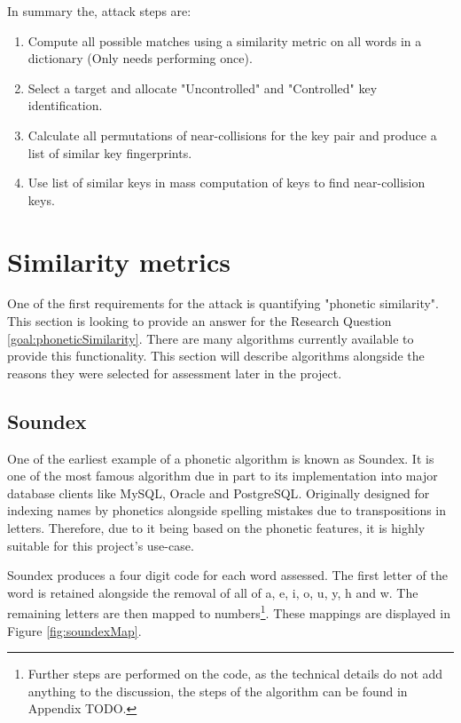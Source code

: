 In summary the, attack steps are:

\begin{enumerate}
    \item Compute all possible matches using a similarity metric on all words in a dictionary (Only needs performing once).

    \item Select a target and allocate "Uncontrolled" and "Controlled" key identification.
    
    \item Calculate all permutations of near-collisions for the key pair and produce a list of similar key fingerprints.
    
    \item Use list of similar keys in mass computation of keys to find near-collision keys.

\end{enumerate}

\section{Similarity metrics}
\label{sec:metrics}
One of the first requirements for the attack is quantifying "phonetic similarity". This section is looking to provide an answer for the Research Question \ref{goal:phoneticSimilarity}. There are many algorithms currently available to provide this functionality. This section will describe algorithms alongside the reasons they were selected for assessment later in the project.

\subsection{Soundex}
One of the earliest example of a phonetic algorithm is known as Soundex. It is one of the most famous algorithm due in part to its implementation into major database clients like MySQL\cite{mysql_soundex}, Oracle\cite{moved_2005} and PostgreSQL\cite{postgresql}. Originally designed for indexing names by phonetics alongside spelling mistakes due to transpositions in letters. Therefore, due to it being based on the phonetic features, it is highly suitable for this project's use-case. 

Soundex produces a four digit code for each word assessed.
The first letter of the word is retained alongside the removal of all of a, e, i, o, u, y, h and w. The remaining letters are then mapped to numbers\footnote{Further steps are performed on the code, as the technical details do not add anything to the discussion, the steps of the algorithm can be found in Appendix TODO.}. These mappings are displayed in Figure \ref{fig:soundexMap}.

